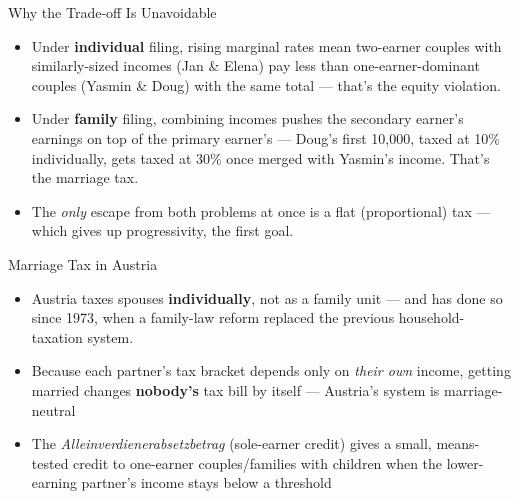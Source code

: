 \documentclass[11pt,aspectratio=169]{beamer}
\begin{document}
\begin{frame}{Why the Trade-off Is Unavoidable}
	\small
	\begin{itemize}
		\item Under \textbf{individual} filing, rising marginal rates mean two-earner couples with similarly-sized incomes (Jan \& Elena) pay less than one-earner-dominant couples (Yasmin \& Doug) with the same total --- that's the equity violation.
		\item Under \textbf{family} filing, combining incomes pushes the secondary earner's earnings on top of the primary earner's --- Doug's first \texteuro{}10{,}000, taxed at 10\% individually, gets taxed at 30\% once merged with Yasmin's income. That's the marriage tax.
		\item The \emph{only} escape from both problems at once is a flat (proportional) tax --- which gives up progressivity, the first goal.
	\end{itemize}
	\vspace{0.3em}
	\centering

\end{frame}



\begin{frame}{Marriage Tax in Austria}

	\begin{itemize}
		\item Austria taxes spouses \textbf{individually}, not as a family unit --- and has done so since 1973, when a family-law reform replaced the previous household-taxation system.
		\item Because each partner's tax bracket depends only on \emph{their own} income, getting married changes \textbf{nobody's} tax bill by itself --- Austria's system is marriage-neutral


		\item The \emph{Alleinverdienerabsetzbetrag} (sole-earner credit) gives a small, means-tested credit to one-earner couples/families with children when the lower-earning partner's income stays below a threshold

\end{itemize}
\end{frame}
\end{document}
